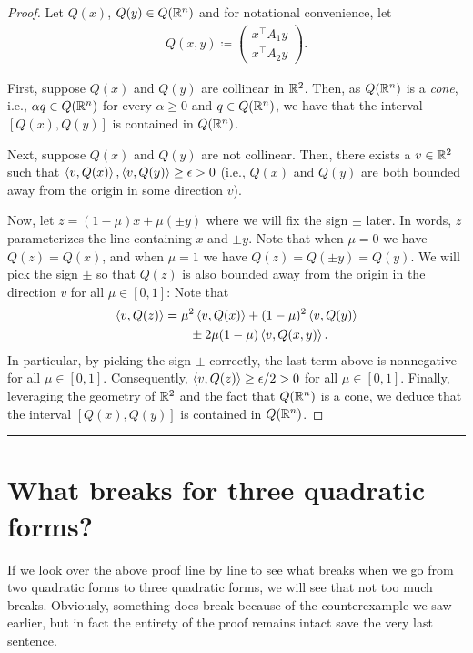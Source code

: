 \documentclass{article}
\begin{document}
\begin{proof}
Let $Q(x)$, $Q(y)\in Q({\mathbb{R}}^n)$ and for notational convenience, let
\begin{align*}
Q(x,y) \coloneqq \begin{pmatrix}
	x^\intercal A_1 y\\
	x^\intercal A_2 y
\end{pmatrix}.
\end{align*}

First, suppose $Q(x)$ and $Q(y)$ are collinear in ${\mathbb{R}}^2$. Then, as $Q({\mathbb{R}}^n)$ is a \textit{cone}, i.e., $\alpha q \in Q({\mathbb{R}}^n)$ for every $\alpha\geq 0$ and $q\in Q({\mathbb{R}}^n)$, we have that the interval $[Q(x),Q(y)]$ is contained in $Q({\mathbb{R}}^n)$.

Next, suppose $Q(x)$ and $Q(y)$ are not collinear.
Then, there exists a $v\in{\mathbb{R}}^2$ such that $\left\langle v, Q(x) \right\rangle, \left\langle v,Q(y) \right\rangle \geq \epsilon >0$ (i.e., $Q(x)$ and $Q(y)$ are both bounded away from the origin in some direction $v$). 

Now, let $z = (1- \mu) x + \mu (\pm y)$ where we will fix the sign $\pm$ later. In words, $z$ parameterizes the line containing $x$ and $\pm y$. Note that when $\mu = 0$ we have $Q(z) = Q(x)$, and when $\mu = 1$ we have $Q(z) = Q(\pm y) = Q(y)$.
We will pick the sign $\pm$ so that $Q(z)$ is also bounded away from the origin in the direction $v$ for all $\mu\in[0,1]$: Note that
\begin{align*}
\left\langle v,Q(z) \right\rangle &= \mu^2 \left\langle v,Q(x) \right\rangle + (1-\mu)^2 \left\langle v,Q(y) \right\rangle\\
&\qquad\pm 2\mu(1-\mu)\left\langle v, Q(x,y) \right\rangle.
\end{align*}
In particular, by picking the sign $\pm$ correctly, the last term above is nonnegative for all $\mu\in[0,1]$. Consequently, $\left\langle v,Q(z) \right\rangle \geq \epsilon/2>0$ for all $\mu\in[0,1]$. Finally, leveraging the geometry of ${\mathbb{R}}^2$ and the fact that $Q({\mathbb{R}}^n)$ is a cone, we deduce that the interval $[Q(x), Q(y)]$ is contained in $Q({\mathbb{R}}^n)$.
\end{proof}

\rule{0.5\linewidth}{\linethickness}
\section{What breaks for three quadratic forms?}
If we look over the above proof line by line to see what breaks when we go from two quadratic forms to three quadratic forms, we will see that not too much breaks.
Obviously, something does break because of the counterexample we saw earlier, but in fact the entirety of the proof remains intact save the very last sentence.
\end{document}
